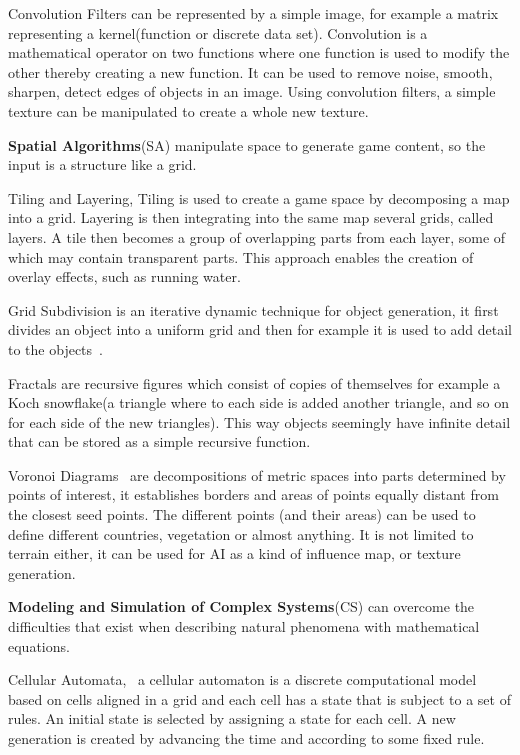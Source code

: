 \documentclass[runningheads]{llncs}
\begin{document}
Convolution Filters can be represented by a simple image, for example a matrix representing a kernel(function or discrete data set). Convolution is a mathematical operator on two functions where one function is used to modify the other thereby creating a new function. It can be used to remove noise, smooth, sharpen, detect edges of objects in an image. Using convolution filters, a simple texture can be manipulated to create a whole new texture.

\textbf{Spatial Algorithms}(SA) manipulate space to generate game content, so the input is a structure like a grid.

Tiling and Layering, Tiling is used to create a game space by decomposing a map into a grid. Layering is then integrating into the same map several grids, called layers. A tile then becomes a group of overlapping parts from each layer, some of which may contain transparent parts. This approach enables the creation of overlay effects, such as running water.

Grid Subdivision is an iterative dynamic technique for object generation, it first divides an object into a uniform grid and then for example it is used to add detail to the objects~\cite{ref_pi}.

Fractals are recursive figures which consist of copies of themselves for example a Koch snowflake(a triangle where to each side is added another triangle, and so on for each side of the new triangles). This way objects seemingly have infinite detail that can be stored as a simple recursive function.

Voronoi Diagrams~\cite{ref_franz} are decompositions of metric spaces into parts determined by points of interest, it establishes borders and areas of points equally distant from the closest seed points. The different points (and their areas) can be used to define different countries, vegetation or almost anything. It is not limited to terrain either, it can be used for AI as a kind of influence map, or texture generation.

\textbf{Modeling and Simulation of Complex Systems}(CS) can overcome the difficulties that exist when describing natural phenomena with mathematical equations.

Cellular Automata,~\cite{ref_chopard} a cellular automaton is a discrete computational model based on cells aligned in a grid and each cell has a state that is subject to a set of rules. An initial state is selected by assigning a state for each cell. A new generation is created by advancing the time and according to some fixed rule.
\end{document}
